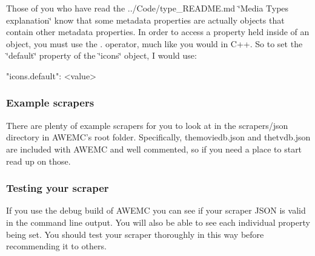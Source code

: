 Those of you who have read the ../\-Code/type\-\_\-\-R\-E\-A\-D\-M\-E.md \char`\"{}\-Media Types explanation\char`\"{} know that some metadata properties are actually objects that contain other metadata properties. In order to access a property held inside of an object, you must use the {\ttfamily .} operator, much like you would in C++. So to set the \char`\"{}default\char`\"{} property of the \char`\"{}icons\char`\"{} object, I would use\-:

\begin{DoxyVerb}"icons.default": <value>
\end{DoxyVerb}


\subsubsection*{Example scrapers}

There are plenty of example scrapers for you to look at in the {\ttfamily scrapers/json} directory in A\-W\-E\-M\-C's root folder. Specifically, {\ttfamily themoviedb.\-json} and {\ttfamily thetvdb.\-json} are included with A\-W\-E\-M\-C and well commented, so if you need a place to start read up on those.

\subsubsection*{Testing your scraper}

If you use the debug build of A\-W\-E\-M\-C you can see if your scraper J\-S\-O\-N is valid in the command line output. You will also be able to see each individual property being set. You should test your scraper thoroughly in this way before recommending it to others. 